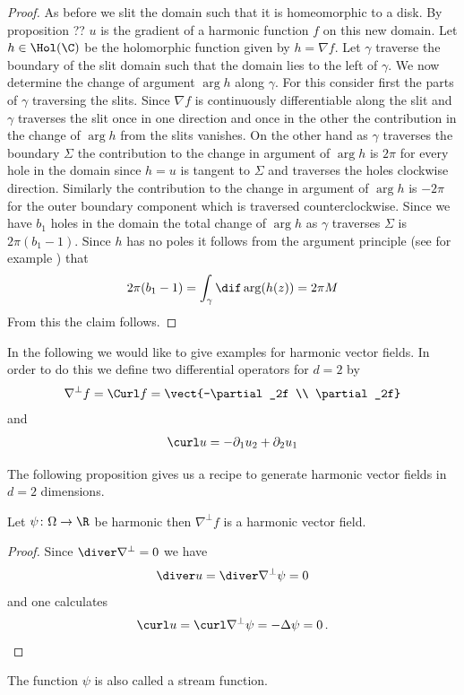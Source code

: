 \begin{proof}
  As before we slit the domain such that it is homeomorphic to a disk. By proposition ?? $u$ is the gradient of a
  harmonic function $f$ on this new domain. Let $h\in\Hol(\C)$ be the holomorphic function given by $h=\nabla f$.
  Let $\gamma$ traverse the boundary of the slit domain such that the domain lies to the left of $\gamma$.
  We now determine the change of argument $\arg h$ along $\gamma$. For this
  consider first the parts of $\gamma$ traversing the slits. Since $\nabla f$ is continuously differentiable
  along the slit and $\gamma$ traverses the slit once in one direction and once in the other 
  the contribution in the change of $\arg h$ from the slits vanishes.
  On the other hand as $\gamma$ traverses the boundary $\Sigma$ the contribution to the change in
  argument of $\arg h$ is $2\pi$ for every hole in the domain 
  since $h=u$ is tangent to $\Sigma$ and traverses the holes clockwise direction.
  Similarly the contribution to the change in argument of $\arg h$ is $-2\pi$ for the outer boundary component
  which is traversed counterclockwise.
  Since we have $b_1$ holes in the domain the total change of $\arg h$ as $\gamma$ traverses $\Sigma$ is
  $2\pi(b_1-1)$.
  Since $h$ has no poles it follows from the argument principle (see for example \cite[Chapter VIII]{Gamelin2001}) that
  \begin{align}
    2\pi(b_1-1)=\int_\gamma\dif\arg (h(z)) =  2\pi M
  \end{align}
  From this the claim follows.
\end{proof}

In the following we would like to give examples for harmonic vector fields.
In order to do this we define two differential operators for $d=2$ by
\begin{align*}
  \nabla^\perp f=\Curl f=\vect{-\partial_2f \\ \partial_2f}
\end{align*}
and
\begin{align*}
  \curl u=-\partial_1u_2+\partial_2u_1
\end{align*}

The following proposition gives us a recipe to generate harmonic vector fields in $d=2$ dimensions.
\begin{proposition}
  Let $\psi\colon\Omega\to\R$ be harmonic then $\nabla^\perp f$ is a harmonic vector field.
\end{proposition} 
\begin{proof}
  Since $\diver \nabla^\perp=0$ we have
  \begin{align*}
    \diver u = \diver\nabla^\perp \psi=0
  \end{align*}
  and one calculates
  \begin{align*}
    \curl u = \curl\nabla^\perp \psi = -\Delta \psi = 0\,.
  \end{align*}
\end{proof}
The function $\psi$ is also called a stream function.

